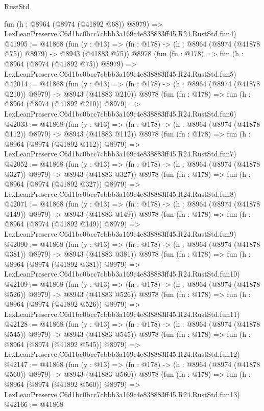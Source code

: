 \begin{lexlean}{RustStd}
\begin{coremodule}
    fun (h : @8964 (@8974 (@41892 @68)) @8979) =>
    LexLeanPreserve.C6d1bc0bcc7cbbb3a169c4e838883ff45.R24.RustStd.fun4)
@41995 := @41868
    (fun (y : @13) => (fn : @178) -> (h : @8964 (@8974 (@41878 @75)) @8979) -> @8943 (@41883 @75))
    @8978
    (fun (fn : @178) =>
    fun (h : @8964 (@8974 (@41892 @75)) @8979) =>
    LexLeanPreserve.C6d1bc0bcc7cbbb3a169c4e838883ff45.R24.RustStd.fun5)
@42014 := @41868
    (fun (y : @13) => (fn : @178) -> (h : @8964 (@8974 (@41878 @210)) @8979) -> @8943 (@41883 @210))
    @8978
    (fun (fn : @178) =>
    fun (h : @8964 (@8974 (@41892 @210)) @8979) =>
    LexLeanPreserve.C6d1bc0bcc7cbbb3a169c4e838883ff45.R24.RustStd.fun6)
@42033 := @41868
    (fun (y : @13) => (fn : @178) -> (h : @8964 (@8974 (@41878 @112)) @8979) -> @8943 (@41883 @112))
    @8978
    (fun (fn : @178) =>
    fun (h : @8964 (@8974 (@41892 @112)) @8979) =>
    LexLeanPreserve.C6d1bc0bcc7cbbb3a169c4e838883ff45.R24.RustStd.fun7)
@42052 := @41868
    (fun (y : @13) => (fn : @178) -> (h : @8964 (@8974 (@41878 @327)) @8979) -> @8943 (@41883 @327))
    @8978
    (fun (fn : @178) =>
    fun (h : @8964 (@8974 (@41892 @327)) @8979) =>
    LexLeanPreserve.C6d1bc0bcc7cbbb3a169c4e838883ff45.R24.RustStd.fun8)
@42071 := @41868
    (fun (y : @13) => (fn : @178) -> (h : @8964 (@8974 (@41878 @149)) @8979) -> @8943 (@41883 @149))
    @8978
    (fun (fn : @178) =>
    fun (h : @8964 (@8974 (@41892 @149)) @8979) =>
    LexLeanPreserve.C6d1bc0bcc7cbbb3a169c4e838883ff45.R24.RustStd.fun9)
@42090 := @41868
    (fun (y : @13) => (fn : @178) -> (h : @8964 (@8974 (@41878 @381)) @8979) -> @8943 (@41883 @381))
    @8978
    (fun (fn : @178) =>
    fun (h : @8964 (@8974 (@41892 @381)) @8979) =>
    LexLeanPreserve.C6d1bc0bcc7cbbb3a169c4e838883ff45.R24.RustStd.fun10)
@42109 := @41868
    (fun (y : @13) => (fn : @178) -> (h : @8964 (@8974 (@41878 @526)) @8979) -> @8943 (@41883 @526))
    @8978
    (fun (fn : @178) =>
    fun (h : @8964 (@8974 (@41892 @526)) @8979) =>
    LexLeanPreserve.C6d1bc0bcc7cbbb3a169c4e838883ff45.R24.RustStd.fun11)
@42128 := @41868
    (fun (y : @13) => (fn : @178) -> (h : @8964 (@8974 (@41878 @545)) @8979) -> @8943 (@41883 @545))
    @8978
    (fun (fn : @178) =>
    fun (h : @8964 (@8974 (@41892 @545)) @8979) =>
    LexLeanPreserve.C6d1bc0bcc7cbbb3a169c4e838883ff45.R24.RustStd.fun12)
@42147 := @41868
    (fun (y : @13) => (fn : @178) -> (h : @8964 (@8974 (@41878 @560)) @8979) -> @8943 (@41883 @560))
    @8978
    (fun (fn : @178) =>
    fun (h : @8964 (@8974 (@41892 @560)) @8979) =>
    LexLeanPreserve.C6d1bc0bcc7cbbb3a169c4e838883ff45.R24.RustStd.fun13)
@42166 := @41868

\end{coremodule}
\end{lexlean}
